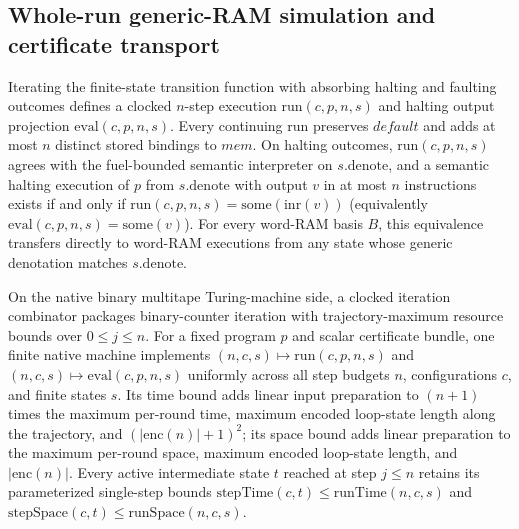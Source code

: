 \begin{result}
\end{result}

\begin{result}
\subsection{Whole-run generic-RAM simulation and certificate transport}
Iterating the finite-state transition function with absorbing halting and faulting outcomes defines
a clocked $n$-step execution $\mathrm{run}(c,p,n,s)$ and halting output projection
$\mathrm{eval}(c,p,n,s)$. Every continuing run preserves $\mathit{default}$ and adds at most $n$
distinct stored bindings to $\mathit{mem}$. On halting outcomes, $\mathrm{run}(c,p,n,s)$ agrees
with the fuel-bounded semantic interpreter on $s.\mathrm{denote}$, and a semantic halting execution
of $p$ from $s.\mathrm{denote}$ with output $v$ in at most $n$ instructions exists if and only if
$\mathrm{run}(c,p,n,s)=\mathrm{some}(\mathrm{inr}(v))$ (equivalently
$\mathrm{eval}(c,p,n,s)=\mathrm{some}(v)$). For every word-RAM basis $B$, this equivalence transfers
directly to word-RAM executions from any state whose generic denotation matches $s.\mathrm{denote}$.

On the native binary multitape Turing-machine side, a clocked iteration combinator packages
binary-counter iteration with trajectory-maximum resource bounds over $0\le j\le n$. For a fixed
program $p$ and scalar certificate bundle, one finite native machine implements
$(n,c,s)\mapsto\mathrm{run}(c,p,n,s)$ and $(n,c,s)\mapsto\mathrm{eval}(c,p,n,s)$ uniformly across
all step budgets $n$, configurations $c$, and finite states $s$. Its time bound adds linear input
preparation to $(n+1)$ times the maximum per-round time, maximum encoded loop-state length along
the trajectory, and $(|\mathrm{enc}(n)|+1)^2$; its space bound adds linear preparation to the
maximum per-round space, maximum encoded loop-state length, and $|\mathrm{enc}(n)|$. Every active
intermediate state $t$ reached at step $j\le n$ retains its parameterized single-step bounds
$\mathrm{stepTime}(c,t)\le\mathrm{runTime}(n,c,s)$ and
$\mathrm{stepSpace}(c,t)\le\mathrm{runSpace}(n,c,s)$.


\end{result}
